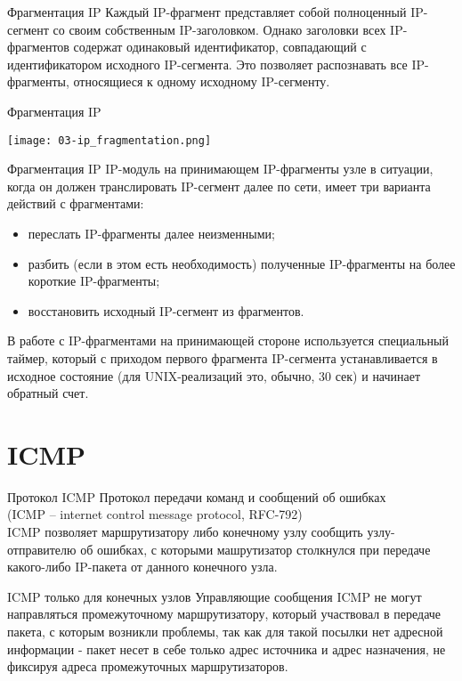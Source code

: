 \begin{frame}{Фрагментация IP}
Каждый IP-фрагмент представляет собой полноценный IP-сегмент со своим собственным IP-заголовком. 
Однако заголовки всех IP-фрагментов содержат одинаковый идентификатор,  
совпадающий с идентификатором исходного IP-сегмента. Это позволяет распознавать все IP-фрагменты,  относящиеся к одному исходному IP-сегменту.	
\end{frame}

\begin{frame}{Фрагментация IP}
	\begin{center}
		\texttt{[image: 03-ip\_fragmentation.png]}
	\end{center}
\end{frame}

\begin{frame}{Фрагментация IP}
IP-модуль на принимающем IP-фрагменты узле в ситуации,  когда он должен транслировать IP-сегмент далее по сети,  имеет три варианта действий с фрагментами:
	\begin{itemize}
		\item переслать IP-фрагменты далее неизменными;
		\item разбить (если в этом есть необходимость) полученные IP-фрагменты на более короткие IP-фрагменты;
		\item восстановить исходный IP-сегмент из фрагментов.
	\end{itemize}
 В работе с IP-фрагментами на принимающей стороне используется специальный таймер,  который с приходом первого фрагмента IP-сегмента устанавливается в исходное состояние (для UNIX-реализаций это,  обычно,  30 сек) и начинает обратный счет.
\end{frame}

\section{ICMP}
\begin{frame}{Протокол ICMP}
	Протокол передачи команд и сообщений об ошибках \\
	(ICMP -- internet control message protocol, RFC-792)\\
	\pause
	\bigskip
ICMP позволяет маршрутизатору либо конечному узлу сообщить узлу-отправителю об ошибках,  
с которыми машрутизатор столкнулся при передаче какого-либо IP-пакета от данного конечного узла.
\end{frame}

\begin{frame}{ICMP только для конечных узлов}
Управляющие сообщения ICMP не могут направляться промежуточному маршрутизатору,
 который участвовал в передаче пакета,  с которым возникли проблемы,  так как для такой посылки нет адресной информации - пакет несет в себе только адрес источника и адрес назначения,  не фиксируя адреса промежуточных маршрутизаторов.
\end{frame}

